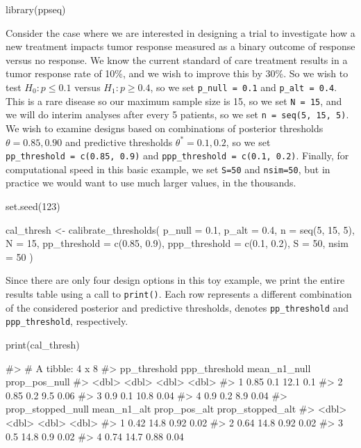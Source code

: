 \begin{Schunk}
\begin{Sinput}
library(ppseq)
\end{Sinput}
\end{Schunk}

Consider the case where we are interested in designing a trial to
investigate how a new treatment impacts tumor response measured as a
binary outcome of response versus no response. We know the current
standard of care treatment results in a tumor response rate of 10\%, and
we wish to improve this by 30\%. So we wish to test \(H_0: p \leq 0.1\)
versus \(H_1: p \geq 0.4\), so we set \texttt{p\_null\ =\ 0.1} and
\texttt{p\_alt\ =\ 0.4}. This is a rare disease so our maximum sample
size is 15, so we set \texttt{N\ =\ 15}, and we will do interim analyses
after every 5 patients, so we set \texttt{n\ =\ seq(5,\ 15,\ 5)}. We
wish to examine designs based on combinations of posterior thresholds
\(\theta = {0.85, 0.90}\) and predictive thresholds
\(\theta^*={0.1, 0.2}\), so we set
\texttt{pp\_threshold\ =\ c(0.85,\ 0.9)} and
\texttt{ppp\_threshold\ =\ c(0.1,\ 0.2)}. Finally, for computational
speed in this basic example, we set \texttt{S=50} and \texttt{nsim=50},
but in practice we would want to use much larger values, in the
thousands.

\begin{Schunk}
\begin{Sinput}
set.seed(123)

cal_thresh <-
  calibrate_thresholds(
    p_null = 0.1, 
    p_alt = 0.4,
    n = seq(5, 15, 5), 
    N = 15,
    pp_threshold = c(0.85, 0.9),
    ppp_threshold = c(0.1, 0.2),
    S = 50, 
    nsim = 50
    )
\end{Sinput}
\end{Schunk}

Since there are only four design options in this toy example, we print
the entire results table using a call to \texttt{print()}. Each row
represents a different combination of the considered posterior and
predictive thresholds, denotes \texttt{pp\_threshold} and
\texttt{ppp\_threshold}, respectively.

\begin{Schunk}
\begin{Sinput}
print(cal_thresh)
\end{Sinput}
\begin{Soutput}
#> # A tibble: 4 x 8
#>   pp_threshold ppp_threshold mean_n1_null prop_pos_null
#>          <dbl>         <dbl>        <dbl>         <dbl>
#> 1         0.85           0.1         12.1          0.1 
#> 2         0.85           0.2          9.5          0.06
#> 3         0.9            0.1         10.8          0.04
#> 4         0.9            0.2          8.9          0.04
#>   prop_stopped_null mean_n1_alt prop_pos_alt prop_stopped_alt
#>               <dbl>       <dbl>        <dbl>            <dbl>
#> 1              0.42        14.8         0.92             0.02
#> 2              0.64        14.8         0.92             0.02
#> 3              0.5         14.8         0.9              0.02
#> 4              0.74        14.7         0.88             0.04
\end{Soutput}
\end{Schunk}


